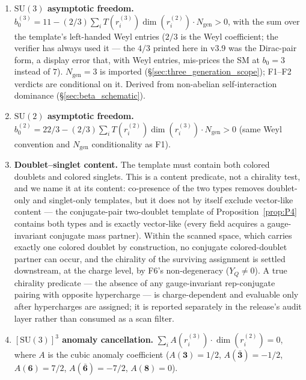 \documentclass[11pt]{article}
\theoremstyle{definition}
\newcommand{\SU}{\mathrm{SU}}
\begin{document}
\begin{enumerate}[label=\textbf{F\arabic*},nosep,leftmargin=3em]
  \item \textbf{$\SU(3)$ asymptotic freedom.}\quad
  $b_0^{(3)} = 11 - (2/3) \sum_i T(r_i^{(3)}) \dim(r_i^{(2)}) \cdot N_{\mathrm{gen}} > 0$,
  with the sum over the template's left-handed Weyl entries ($2/3$ is
  the Weyl coefficient; the verifier has always used it --- the $4/3$
  printed here in v3.9 was the Dirac-pair form, a display error that,
  with Weyl entries, mis-prices the SM at $b_0 = 3$ instead of $7$).
  $N_{\mathrm{gen}} = 3$ is imported (\S\ref{sec:three_generation_scope});
  F1--F2 verdicts are conditional on it.
  Derived from non-abelian self-interaction dominance (\S\ref{sec:beta_schematic}).

  \item \textbf{$\SU(2)$ asymptotic freedom.}\quad
  $b_0^{(2)} = 22/3 - (2/3) \sum_i T(r_i^{(2)}) \dim(r_i^{(3)}) \cdot N_{\mathrm{gen}} > 0$
  (same Weyl convention and $N_{\mathrm{gen}}$ conditionality as F1).

  \item \textbf{Doublet--singlet content.}\quad
  The template must contain both colored doublets and colored
  singlets.  This is a content predicate, not a chirality test, and
  we name it at its content: co-presence of the two types removes
  doublet-only and singlet-only templates, but it does not by itself
  exclude vector-like content --- the conjugate-pair two-doublet
  template of Proposition~\ref{prop:P4} contains both types and is
  exactly vector-like (every field acquires a gauge-invariant
  conjugate mass partner).  Within the scanned space, which carries
  exactly one colored doublet by construction, no conjugate
  colored-doublet partner can occur, and the chirality of the
  surviving assignment is settled downstream, at the charge level, by
  F6's non-degeneracy ($Y_Q \neq 0$).  A true chirality predicate ---
  the absence of any gauge-invariant rep-conjugate pairing with
  opposite hypercharge --- is charge-dependent and evaluable only
  after hypercharges are assigned; it is reported separately in the
  release's audit layer rather than consumed as a scan filter.

  \item \textbf{$[\SU(3)]^3$ anomaly cancellation.}\quad
  $\sum_i A(r_i^{(3)}) \cdot \dim(r_i^{(2)}) = 0$, where $A$ is the
  cubic anomaly coefficient ($A(\mathbf{3}) = 1/2$,
  $A(\bar{\mathbf{3}}) = -1/2$, $A(\mathbf{6}) = 7/2$,
  $A(\bar{\mathbf{6}}) = -7/2$, $A(\mathbf{8}) = 0$).


\end{enumerate}
\end{document}
